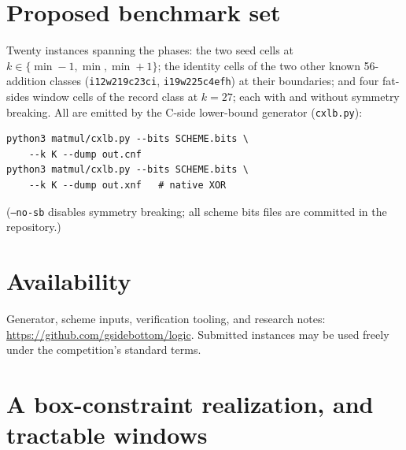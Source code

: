 \documentclass[conference]{IEEEtran}
\begin{document}
\section{Proposed benchmark set}

Twenty instances spanning the phases: the two seed cells at $k \in
\{\min{-}1, \min, \min{+}1\}$; the identity cells of the two other
known 56-addition classes (\texttt{i12w219c23ci},
\texttt{i19w225c4efh}) at their boundaries; and four fat-sides
window cells of the record class at $k=27$; each with and without
symmetry breaking. All are emitted by the C-side lower-bound generator (\texttt{cxlb.py}):

\begin{verbatim}
python3 matmul/cxlb.py --bits SCHEME.bits \
    --k K --dump out.cnf
python3 matmul/cxlb.py --bits SCHEME.bits \
    --k K --dump out.xnf   # native XOR
\end{verbatim}

\noindent(\texttt{--no-sb} disables symmetry breaking; all scheme
bits files are committed in the repository.)

\section{Availability}

Generator, scheme inputs, verification tooling, and research notes:
\url{https://github.com/gsidebottom/logic}. Submitted instances may
be used freely under the competition's standard terms.

\appendix
\section{A box-constraint realization, and tractable windows}
\label{app:slp}
\end{document}
